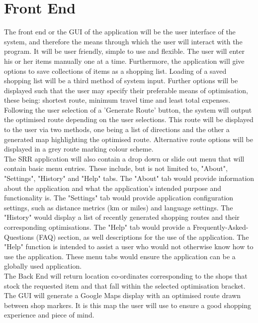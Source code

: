 \documentclass[10pt, a4paper, onecolumn]{scrartcl}
\begin{document}
	\section{Front End}
		
		The front end or the GUI of the application will be the user interface of the system, and therefore the means through which the user will interact with the program. It will be user friendly, simple to use and flexible. The user will enter his or her items manually one at a time. Furthermore, the application will give options to save collections of items as a shopping list. Loading of a saved shopping list will be a third method of system input. Further options will be displayed such that the user may specify their preferable means of optimisation, these being: shortest route, minimum travel time and least total expenses. Following the user selection of a 'Generate Route' button, the system will output the optimised route depending on the user selections. This route will be displayed to the user via two methods, one being a list of directions and the other a generated map highlighting the optimised route. Alternative route options will be displayed in a grey route marking colour scheme. \\
		
		The SRR application will also contain a drop down or slide out menu that will contain basic menu entries. These include, but is not limited to, "About", "Settings", "History" and "Help" tabs. The "About" tab would provide information about the application and what the application's intended purpose and functionality is. The "Settings" tab would provide application configuration settings, such as distance metrics (km or miles) and language settings. The "History" would display a list of recently generated shopping routes and their corresponding optimisations. The "Help" tab would provide a Frequently-Asked-Questions (FAQ) section, as well descriptions for the use of the application. The "Help" function is intended to assist a user who would not otherwise know how to use the application. These menu tabs would ensure the application can be a globally used application.  \\
		
		The Back End will return location co-ordinates corresponding to the shops that stock the requested item and that fall within the selected optimisation bracket. The GUI will generate a Google Maps display with an optimised route drawn between shop markers. It is this map the user will use to ensure a good shopping experience and piece of mind.  
	
\end{document}
